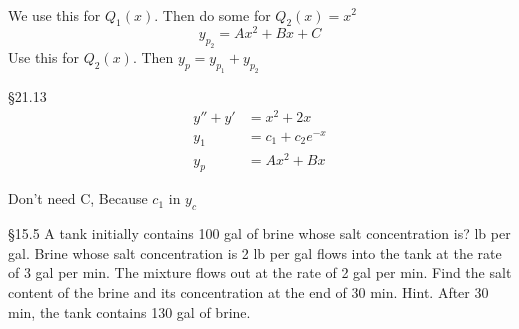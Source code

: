 \begin{rvw}
\begin{ex}
\begin{align*}
\end{align*}
\begin{note}
We use this for $Q_1(x)$. Then do some for $Q_2(x)=x^2$ $$y_{p_2}=Ax^2+Bx+C$$ Use this for $Q_2(x)$. Then $y_p=y_{p_1}+y_{p_2}$
\end{note}
\end{ex}
\begin{ex}
\S 21.13
\begin{align*}
    y''+y'&=x^2+2x\\
    y_1&=c_1+c_2e^{-x}\\
    y_p&=Ax^2+Bx
\end{align*}
\begin{note}
Don't need C, Because $c_1$ in $y_c$
\end{note}
\end{ex}
\begin{ex}
\S 15.5 A tank initially contains 100 gal of brine whose salt concentration is? lb per gal. Brine whose salt concentration is 2 lb per gal flows into the tank at the rate of 3 gal per min. The mixture flows out at the rate of 2 gal per min. Find the salt content of the brine and its concentration at the end of 30 min. Hint. After 30 min, the tank contains 130 gal of brine.
\end{ex}
\end{rvw}